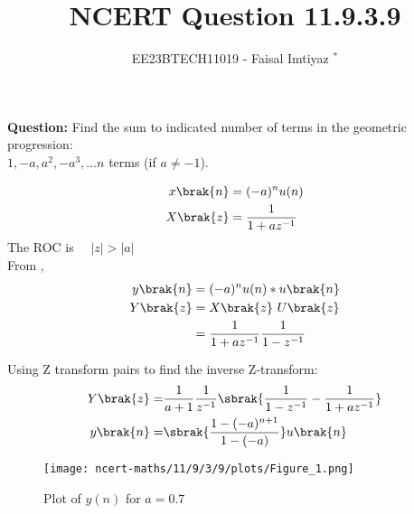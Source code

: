 \documentclass[journal,12pt,twocolumn]{IEEEtran}
\theoremstyle{remark}
\begin{document}

\vspace{3cm}
\title{NCERT Question 11.9.3.9}
\author{EE23BTECH11019 - Faisal Imtiyaz $^{*}$%
}
\maketitle
\newpage
\bigskip

\renewcommand{\thefigure}{\arabic{figure}}
\renewcommand{\thetable}{\arabic{table}}


\vspace{3cm}
\textbf{Question:} Find the sum to indicated number of terms in the geometric progression:\\
$1,-a, a^2, -a^3,...n$ terms (if $a\neq-1$).\\
\solution
\fi


\begin{align}
x\brak{n} &= (-a)^{n}u(n)\\
X\brak{z} &=  \frac{1}{1+az^{-1}}
\end{align}
The ROC is $ \quad |z| > |a|$\\
From ,
\begin{align}
y\brak{n} &={(-a)^n}u(n)*u\brak{n}\\
Y\brak{z} &= X\brak{z}\ U\brak{z}\\
&=\frac{1}{1+az^{-1}}\frac{1}{1-z^{-1}}
\end{align}



Using Z transform pairs  to find the inverse Z-transform:\\
\begin{align}
    Y\brak{z}=& \frac{1}{a+1} \frac{1}{z^{-1}}\sbrak{\frac{1}{1-z^{-1}} - \frac{1}{1+az^{-1}}}\\
    y\brak{n} =&  \sbrak{\frac{1-(-a)^{n+1}}{1-(-a)}}u\brak{n}
\end{align}
\begin{figure}[ht!]
	\texttt{[image: ncert-maths/11/9/3/9/plots/Figure\_1.png]}
	\caption{Plot of $y(n)$ for $a=0.7$}
	\label{fig:1.2}
\end{figure}
\end{document}
